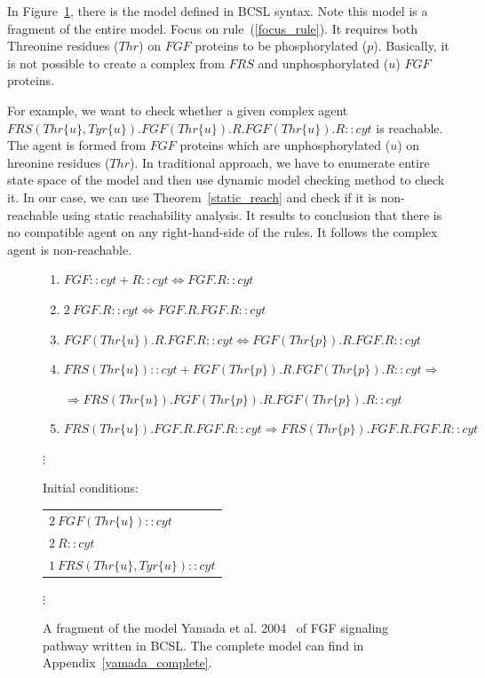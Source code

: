 \documentclass[12pt]{fithesis2}
\begin{document}
In Figure~\ref{fgf_fragment}, there is the model defined in BCSL syntax. Note this model is a fragment of the entire model. Focus on rule~(\ref{focus_rule}). It requires both Threonine residues ($Thr$) on $FGF$ proteins to be phosphorylated ($p$). Basically, it is not possible to create a complex from $FRS$ and unphosphorylated ($u$) $FGF$ proteins.

For example, we want to check whether a given complex agent {\small $FRS(Thr\{u\}, Tyr\{u\}).FGF(Thr\{u\}).R.FGF(Thr\{u\}).R::cyt$} is reachable. The agent is formed from $FGF$ proteins which are unphosphorylated ($u$) on hreonine residues ($Thr$). In traditional approach, we have to enumerate entire state space of the model and then use dynamic model checking method to check it. In our case, we can use Theorem~\ref{static_reach} and check if it is non-reachable using static reachability analysis. It results to conclusion that there is no compatible agent on any right-hand-side of the rules. It follows the complex agent is non-reachable.

\begin{figure}[!h]
{\footnotesize
\begin{center}
\begin{enumerate}
\item $FGF::cyt + R::cyt \Leftrightarrow FGF.R::cyt$ 
\item $2~ FGF.R::cyt \Leftrightarrow FGF.R.FGF.R::cyt$
\item $FGF(Thr\{u\}).R.FGF.R::cyt \Leftrightarrow FGF(Thr\{p\}).R.FGF.R::cyt$ 
\item \label{focus_rule} $FRS(Thr\{u\})::cyt + FGF(Thr\{p\}).R.FGF(Thr\{p\}).R::cyt \Rightarrow$ 

$\Rightarrow FRS(Thr\{u\}).FGF(Thr\{p\}).R.FGF(Thr\{p\}).R::cyt$ 

\item $FRS(Thr\{u\}).FGF.R.FGF.R::cyt \Rightarrow FRS(Thr\{p\}).FGF.R.FGF.R::cyt$ 

\end{enumerate}

$\vdots$

\vspace*{0.5cm}
Initial conditions:
\begin{tabular}{l}
$2~ FGF(Thr\{u\})::cyt$\\
$2~ R::cyt$\\
$1~ FRS(Thr\{u\}, Tyr\{u\})::cyt$\\
\end{tabular}

$\vdots$

\end{center}

}
\caption{A fragment of the model Yamada et al. 2004~\cite{yamada2004model} of FGF signaling pathway written in BCSL. The complete model can find in Appendix~\ref{yamada_complete}.}\label{fgf_fragment}
\end{figure}
\end{document}
